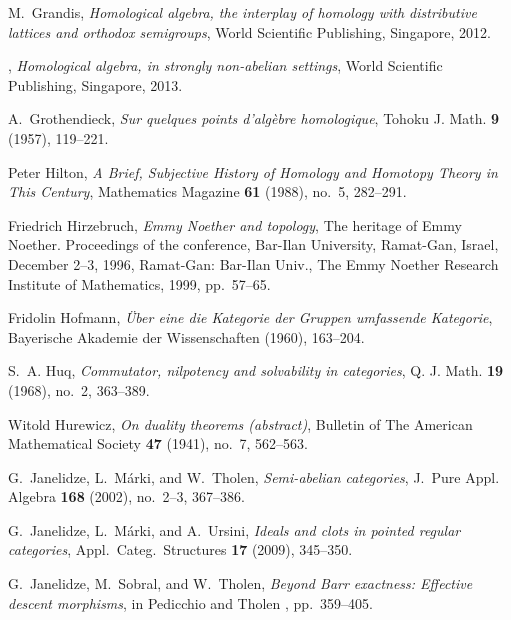 \documentclass [12pt,oneside]{book}%
\theoremstyle{captionstyle}  %
\begin{document}
\begin{thebibliography}{10}
    M.~Grandis, \emph{Homological algebra, the interplay of homology with
        distributive lattices and orthodox semigroups}, World Scientific Publishing,
    Singapore, 2012.

    \bysame, \emph{Homological algebra, in strongly non-abelian settings}, World
    Scientific Publishing, Singapore, 2013.

    A.~Grothendieck, \emph{Sur quelques points d'alg{\`e}bre homologique}, Tohoku
    J. Math. \textbf{9} (1957), 119--221.

    Peter Hilton, \emph{{A Brief, Subjective History of Homology and Homotopy
                Theory in This Century}}, Mathematics Magazine \textbf{61} (1988), no.~5,
    282--291.

    Friedrich Hirzebruch, \emph{Emmy {Noether} and topology}, The heritage of Emmy
    Noether. Proceedings of the conference, Bar-Ilan University, Ramat-Gan,
    Israel, December 2--3, 1996, Ramat-Gan: Bar-Ilan Univ., The Emmy Noether
    Research Institute of Mathematics, 1999, pp.~57--65.

    Fridolin Hofmann, \emph{{\"Uber eine die Kategorie der Gruppen umfassende
                Kategorie}}, Bayerische Akademie der Wissenschaften (1960), 163--204.

    S.~A. Huq, \emph{Commutator, nilpotency and solvability in categories}, Q. J.
    Math. \textbf{19} (1968), no.~2, 363--389.

    Witold Hurewicz, \emph{On duality theorems (abstract)}, Bulletin of The
    American Mathematical Society \textbf{47} (1941), no.~7, 562--563.

    G.~Janelidze, L.~M{\'a}rki, and W.~Tholen, \emph{Semi-abelian categories},
    J.~Pure Appl. Algebra \textbf{168} (2002), no.~2--3, 367--386.

    G.~Janelidze, L.~M{\'a}rki, and A.~Ursini, \emph{Ideals and clots in pointed
        regular categories}, Appl.\ Categ.\ Structures \textbf{17} (2009), 345--350.

    G.~Janelidze, M.~Sobral, and W.~Tholen, \emph{Beyond {B}arr exactness:
        Effective descent morphisms}, in Pedicchio and Tholen
    \cite{CategoricalFoundations}, pp.~359--405.


\end{thebibliography}
\end{document}
